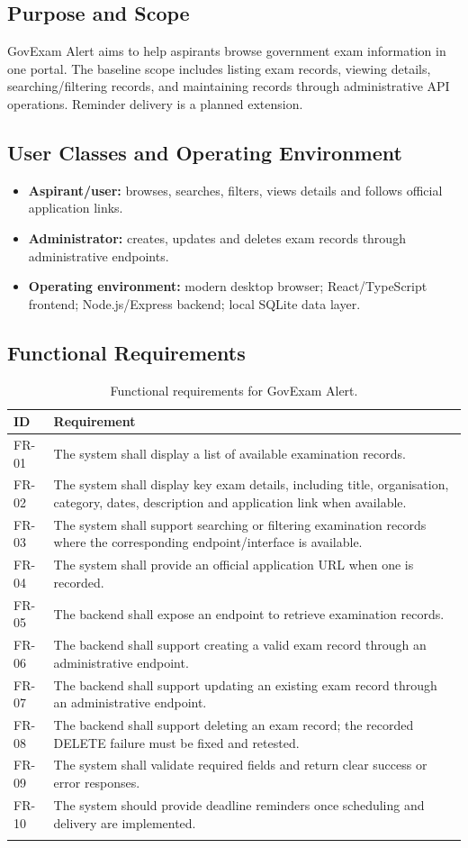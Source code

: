 \documentclass[12pt,a4paper]{report}
\begin{document}
\subsection{Purpose and Scope}
GovExam Alert aims to help aspirants browse government exam information in one portal. The baseline scope includes listing exam records, viewing details, searching/filtering records, and maintaining records through administrative API operations. Reminder delivery is a planned extension.

\subsection{User Classes and Operating Environment}
\begin{itemize}
\item \textbf{Aspirant/user:} browses, searches, filters, views details and follows official application links.
\item \textbf{Administrator:} creates, updates and deletes exam records through administrative endpoints.
\item \textbf{Operating environment:} modern desktop browser; React/TypeScript frontend; Node.js/Express backend; local SQLite data layer.
\end{itemize}

\subsection{Functional Requirements}
\begin{longtable}{p{} p{}}
\toprule\textbf{ID} & \textbf{Requirement}\\\midrule
FR-01 & The system shall display a list of available examination records.\\
FR-02 & The system shall display key exam details, including title, organisation, category, dates, description and application link when available.\\
FR-03 & The system shall support searching or filtering examination records where the corresponding endpoint/interface is available.\\
FR-04 & The system shall provide an official application URL when one is recorded.\\
FR-05 & The backend shall expose an endpoint to retrieve examination records.\\
FR-06 & The backend shall support creating a valid exam record through an administrative endpoint.\\
FR-07 & The backend shall support updating an existing exam record through an administrative endpoint.\\
FR-08 & The backend shall support deleting an exam record; the recorded DELETE failure must be fixed and retested.\\
FR-09 & The system shall validate required fields and return clear success or error responses.\\
FR-10 & The system should provide deadline reminders once scheduling and delivery are implemented.\\
\bottomrule
\caption{Functional requirements for GovExam Alert.}\label{tab:fr}
\end{longtable}
\end{document}

